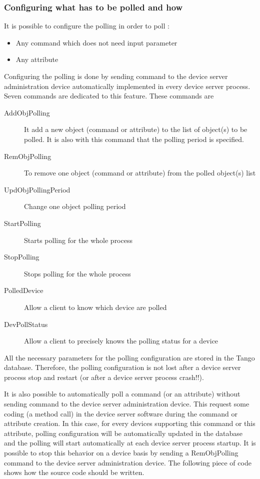 \subsubsection{Configuring what has to be polled and how}

It is possible to configure the polling in order to poll :
\begin{itemize}
\item Any command which does not need input parameter
\item Any attribute
\end{itemize}
Configuring the polling is done by sending command to the device server
administration device automatically implemented in every device server
process. Seven commands are dedicated to this feature. These commands
are
\begin{description}
\item [{AddObjPolling}] It add a new object (command
or attribute) to the list of object(s) to be polled. It is also with
this command that the polling period is specified.
\item [{RemObjPolling}] To remove one object (command
or attribute) from the polled object(s) list
\item [{UpdObjPollingPeriod}] Change one object
polling period
\item [{StartPolling}] Starts polling for the whole
process
\item [{StopPolling}] Stops polling for the whole process
\item [{PolledDevice}] Allow a client to know which
device are polled
\item [{DevPollStatus}] Allow a client to precisely
knows the polling status for a device
\end{description}
All the necessary parameters for the polling configuration are stored
in the Tango database. Therefore, the polling configuration is not
lost after a device server process stop and restart (or after a device
server process crash!!).

It is also possible to automatically poll a command (or an attribute)
without sending command to the device server administration device.
This request some coding (a method call) in the device server software
during the command or attribute creation. In this case, for every
devices supporting this command or this attribute, polling configuration
will be automatically updated in the database and the polling will
start automatically at each device server process startup. It is possible
to stop this behavior on a device basis by sending a RemObjPolling
command to the device server administration device. The following
piece of code shows how the source code should be written.

